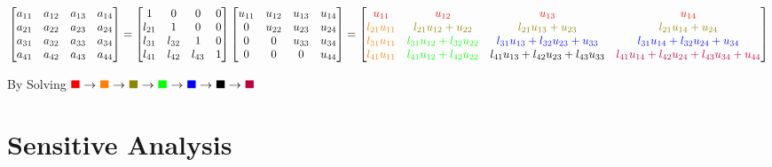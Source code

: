 \documentclass[9pt]{article}
\begin{document}
\vspace{-5pt}
{\scriptsize 
\[
\begin{bmatrix}
a_{11} & a_{12} & a_{13} & a_{14} \\
a_{21} & a_{22} & a_{23} & a_{24} \\
a_{31} & a_{32} & a_{33} & a_{34} \\
a_{41} & a_{42} & a_{43} & a_{44} 
\end{bmatrix}
=
\begin{bmatrix}
1 & 0 & 0 & 0 \\
l_{21} & 1 & 0 & 0 \\
l_{31} & l_{32} & 1 & 0 \\
l_{41} & l_{42} & l_{43} & 1
\end{bmatrix}
\begin{bmatrix}
u_{11} & u_{12} & u_{13} & u_{14} \\
0 & u_{22} & u_{23} & u_{24} \\
0 & 0 & u_{33} & u_{34} \\
0 & 0 & 0 & u_{44}
\end{bmatrix}
=
\begin{bmatrix}
\textcolor{red}{u_{11}} & \textcolor{red}{u_{12}} & \textcolor{red}{u_{13}} & \textcolor{red}{u_{14}} \\
\textcolor{orange}{l_{21} u_{11}} & \textcolor{olive}{l_{21} u_{12} + u_{22}} & \textcolor{olive}{l_{21} u_{13} + u_{23}} & \textcolor{olive}{l_{21} u_{14} + u_{24}} \\
\textcolor{orange}{l_{31} u_{11}} & \textcolor{green}{l_{31} u_{12} + l_{32} u_{22}} & \textcolor{blue}{l_{31} u_{13} + l_{32} u_{23} + u_{33}} & \textcolor{blue}{l_{31} u_{14} + l_{32} u_{24} + u_{34}} \\
\textcolor{orange}{l_{41} u_{11}} & \textcolor{green}{l_{41} u_{12} + l_{42} u_{22}} & \textcolor{black}{l_{41} u_{13} + l_{42} u_{23} + l_{43} u_{33}} & \textcolor{purple}{l_{41} u_{14} + l_{42} u_{24} + l_{43} u_{34} + u_{44}}
\end{bmatrix}
\]
}
\vspace{-5pt}

\quad By Solving $\textcolor{red}{\blacksquare} \to \textcolor{orange}{\blacksquare} \to \textcolor{olive}{\blacksquare} \to \textcolor{green}{\blacksquare} \to \textcolor{blue}{\blacksquare} \to \textcolor{black}{\blacksquare} \to \textcolor{purple}{\blacksquare}  $


\section{Sensitive Analysis} %
\end{document}
